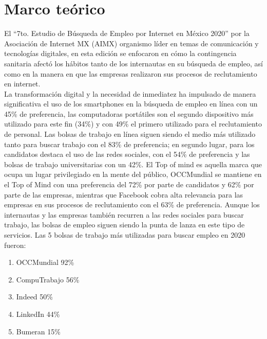 \section{Marco teórico}
    El ``7to. Estudio de Búsqueda de Empleo por Internet en México 2020'' por la Asociación de Internet MX (AIMX)
    organismo líder en temas de comunicación y tecnologías digitales, en esta edición se enfocaron en cómo la
    contingencia sanitaria afectó los hábitos tanto de los internautas en su búsqueda de empleo, así como en la manera en
    que las empresas realizaron sus procesos de reclutamiento en internet.\\
    \newline
    La transformación digital y la necesidad de inmediatez ha impulsado de manera significativa el uso de los smartphones
    en la búsqueda de empleo en línea con un 45\% de preferencia, las computadoras portátiles son el segundo dispositivo
    más utilizado para este fin (34\%) y con 49\% el primero utilizado para el reclutamiento de personal. Las bolsas de
    trabajo en línea siguen siendo el medio más utilizado tanto para buscar trabajo con el 83\% de preferencia; en segundo
    lugar, para los candidatos destaca el uso de las redes sociales, con el 54\% de preferencia y las bolsas de trabajo
    universitarias con un 42\%. 
    El Top of mind es aquella marca que ocupa un lugar privilegiado en la mente del público, OCCMundial se mantiene
    en el Top of Mind con una preferencia del 72\% por parte de candidatos y 62\% por parte de las empresas, mientras que
    Facebook cobra alta relevancia para las empresas en sus procesos de reclutamiento con el 63\% de preferencia.
    Aunque los internautas y las empresas también recurren a las redes sociales para buscar trabajo, las bolsas de empleo
    siguen siendo la punta de lanza en este tipo de servicios. Las 5 bolsas de trabajo más utilizadas para buscar empleo en
    2020 fueron:
    \begin{enumerate}
        \item OCCMundial 92\%
        \item CompuTrabajo 56\%
        \item Indeed 50\%
        \item LinkedIn 44\%
        \item Bumeran 15\%
    \end{enumerate}

